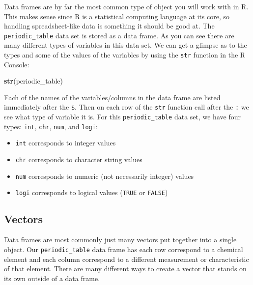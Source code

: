 \documentclass[]{tufte-book}
\newenvironment{Shaded}{\begin{snugshade}}{\end{snugshade}}
\newcommand{\KeywordTok}[1]{\textcolor[rgb]{0.13,0.29,0.53}{\textbf{{#1}}}}
\newcommand{\NormalTok}[1]{{#1}}
\providecommand{\tightlist}{%
  \setlength{\itemsep}{0pt}\setlength{\parskip}{0pt}}
\begin{document}
Data frames are by far the most common type of object you will work with
in R. This makes sense since R is a statistical computing language at
its core, so handling spreadsheet-like data is something it should be
good at. The \texttt{periodic\_table} data set is stored as a data
frame. As you can see there are many different types of variables in
this data set. We can get a glimpse as to the types and some of the
values of the variables by using the \texttt{str} function in the R
Console:

\begin{Shaded}
\begin{Highlighting}[]
\KeywordTok{str}\NormalTok{(periodic_table)}
\end{Highlighting}
\end{Shaded}

Each of the names of the variables/columns in the data frame are listed
immediately after the \texttt{\$}. Then on each row of the \texttt{str}
function call after the \texttt{:} we see what type of variable it is.
For this \texttt{periodic\_table} data set, we have four types:
\texttt{int}, \texttt{chr}, \texttt{num}, and \texttt{logi}:

\begin{itemize}
\tightlist
\item
  \texttt{int} corresponds to integer values
\item
  \texttt{chr} corresponds to character string values
\item
  \texttt{num} corresponds to numeric (not necessarily integer) values
\item
  \texttt{logi} corresponds to logical values (\texttt{TRUE} or
  \texttt{FALSE})
\end{itemize}

\subsection{Vectors}\label{vectors}

Data frames are most commonly just many vectors put together into a
single object. Our \texttt{periodic\_table} data frame has each row
correspond to a chemical element and each column correspond to a
different measurement or characteristic of that element. There are many
different ways to create a vector that stands on its own outside of a
data frame. \newline\vspace*{0.1in}

\vspace*{0.2in}
\end{document}

